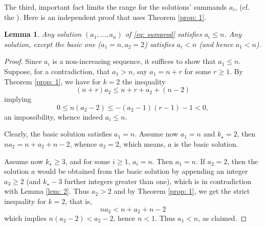 \documentclass[10pt]{article}
\newtheorem{lemma}{Lemma}
\theoremstyle{definition}
\theoremstyle{remark}
\numberwithin{equation}{section}
\begin{document}
The third, important fact limits the range for the solutions' summands $a_i$,  (cf. the \cite[Boundedness Proposition 1 and 2]{ecker}). Here is an independent proof that uses Theorem \ref{prop: 1}.
\begin{lemma}\label{lem: 1}
Any solution $(a_1,\dots,a_n)$ of \eqref{eq: sumprod} satisfies $a_i\leq n$. Any solution, except the basic one ($a_1=n, a_2=2$) satisfies $a_i<n$ (and hence $a_1<n$).
\end{lemma}
\begin{proof}
Since $a_i$ is a non-increasing sequence, it suffices to show that $a_1\leq n$. Suppose, for a contradiction, that $a_1>n$, say $a_1=n+r$ for some $r\geq 1$. By Theorem \ref{prop: 1}, we have for $k=2$ the inequality
\[
(n+r)a_2\leq n+r+a_2+(n-2)
\]
implying
\[
0\leq n(a_2-2)\leq -(a_2-1)(r-1)-1<0,
\]
an impossibility, whence indeed $a_i\leq n$.

Clearly, the basic solution satisfies $a_1=n$. Assume now $a_1=n$ and $k_\star=2$, then $na_2=n+a_2+n-2$, whence $a_2=2$, which means, $a$ is the basic solution. 

Assume now $k_\star\geq 3$, and for some $i\geq 1$, $a_i=n$. Then $a_1=n$. If $a_2=2$, then the solution $a$ would be obtained from the basic solution by appending an integer $a_3\geq 2$ (and $k_\star-3$ further integers greater than one), which is in contradiction with Lemma \ref{lem: 2}.  Thus $a_2>2$ and by Theorem \ref{prop: 1}, we get the strict inequality for $k=2$, that is,
\[
n a_2<n+a_2+n-2
\]
which implies $n(a_2-2)<a_2-2$, hence $n<1$. Thus $a_1<n$, as claimed.
\end{proof}
\end{document}
